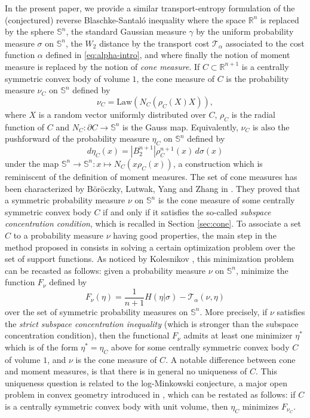 \documentclass[10pt]{amsart}
\theoremstyle{definition}
\theoremstyle{remark}
\newcommand{\R}{\mathbb{R}}
\newcommand{\Sd}{\mathbb{S}}
\begin{document}
In the present paper, we provide a similar transport-entropy formulation of the (conjectured) reverse Blaschke-Santal\'o inequality where the space $\R^n$ is replaced by the sphere $\Sd^n$, the standard Gaussian measure $\gamma$ by the uniform probability measure $\sigma$ on $\Sd^n$, the $W_2$ distance by the transport cost $\mathcal{T}_\alpha$ associated to the cost function $\alpha$ defined in \eqref{eq:alpha-intro}, and where finally the notion of moment measure is replaced by the notion of \emph{cone measure}. If $C\subset \R^{n+1}$ is a centrally symmetric convex body of volume $1$, the cone measure of $C$ is the probability measure $\nu_C$ on $\Sd^n$ defined by
\[
\nu_C = \mathrm{Law} \left(N_C \left(\rho_C(X)X\right)\right),
\]
where $X$ is a random vector uniformly distributed over $C$, $\rho_C$ is the radial function of $C$ and $N_C: \partial C \to \Sd^n$ is the Gauss map. 
Equivalently, $\nu_C$ is also the pushforward of the probability measure $\eta_C$ on $\Sd^n$ defined by
\begin{equation}\label{eq:eta_C-intro}
d\eta_C(x) = |B_2^{n+1}| \rho_C^{n+1}(x)\,d\sigma(x)
\end{equation}
under the map $\Sd^n \to \Sd^n:x \mapsto N_C(x\rho_C(x))$, a construction which is reminiscent of the definition of moment measures.
The set of cone measures has been characterized by  B\"or\"oczky, Lutwak, Yang and Zhang in \cite{BLYZ13}. They proved that a symmetric probability measure $\nu$ on $\Sd^n$ is the cone measure of some centrally symmetric convex body $C$ if and only if it satisfies the so-called \emph{subspace concentration condition}, which is recalled in Section \ref{sec:cone}. 
To associate a set $C$ to a probability measure $\nu$ having good properties, the main step in the method proposed in \cite{BLYZ13} consists in solving a certain optimization problem over the set of support functions. As noticed by Kolesnikov \cite{Kol20}, this minimization problem can be recasted as follows: given a probability measure $\nu$ on $\Sd^n$, minimize the function
$F_\nu$ defined by
\[
F_\nu(\eta) = \frac{1}{n+1} H(\eta|\sigma) - \mathcal{T}_\alpha (\nu,\eta)
\]
over the set of symmetric probability measures on $\Sd^n$. More precisely, if $\nu$ satisfies the \emph{strict subspace concentration inequality} (which is stronger than the subspace concentration condition), then the functional $F_\nu$ admits at least one minimizer $\eta^*$ which is of the form $\eta^*=\eta_C$ above for some centrally symmetric convex body $C$ of volume $1$, and $\nu$ is the cone measure of $C$. 
A notable difference between cone and moment measures, is that there is in general no uniqueness of $C$. This uniqueness question is related to the log-Minkowski conjecture, a major open problem in convex geometry introduced in \cite{BLYZ12}, which can be restated as follows: if $C$ is a centrally symmetric convex body with unit volume, then $\eta_C$ minimizes $F_{\nu_C}$.
\end{document}
